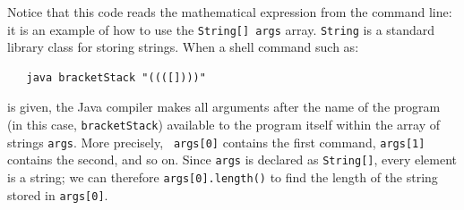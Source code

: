 \documentclass[a4paper]{book}
\theoremstyle{changebreak}                %
\begin{document}
Notice that this code reads the mathematical expression from the
command line: it is an example of how to use the {\tt String[] args}
array. {\tt String} is a standard library
class for storing strings. When a shell command such as:
\begin{verbatim}
   java bracketStack "((([])))"
\end{verbatim}
is given, the Java compiler makes all arguments after the name of the
program (in this case, {\tt bracketStack}) available to the program
itself within the array of strings {\tt args}. More precisely, {\tt
  args[0]} contains the first command, {\tt args[1]} contains the
second, and so on. Since {\tt args} is declared as {\tt String[]},
every element is a string; we can therefore {\tt args[0].length()} to
find the length of the string stored in {\tt args[0]}. 
\end{document}
